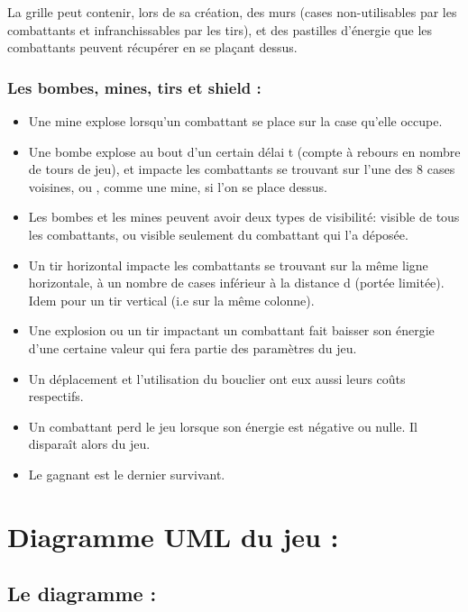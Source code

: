 \documentclass{article}
\begin{document}
La grille peut contenir, lors de sa création, des murs (cases non-utilisables par les combattants et infranchissables par les tirs), et des pastilles d'énergie que les combattants peuvent récupérer en se plaçant dessus.

\vspace{1\baselineskip}

\subsubsection{Les bombes, mines, tirs et shield :}

\vspace{1\baselineskip}

\begin{itemize}
    \item Une mine explose lorsqu'un combattant se place sur la case qu'elle occupe.
    \item Une bombe explose au bout d'un certain délai t (compte à rebours en nombre de tours de jeu),
	et impacte les combattants se trouvant sur l'une des 8 cases voisines, ou , comme une mine,	si l'on se place dessus.
	\item Les bombes et les mines peuvent avoir deux types de visibilité: visible de tous les combattants, ou visible seulement du combattant qui l'a déposée.
	\item Un tir horizontal impacte les combattants se trouvant sur la même ligne horizontale, à un nombre de cases inférieur à la distance d (portée limitée). Idem pour un tir vertical (i.e sur la même
	colonne).
	\item Une explosion ou un tir impactant un combattant fait baisser son énergie d'une certaine valeur qui fera partie des paramètres du jeu.
	\item Un déplacement et l'utilisation du bouclier ont eux aussi leurs coûts respectifs.
    \item Un combattant perd le jeu lorsque son énergie est négative ou nulle. Il disparaît alors du jeu.
    \item Le gagnant est le dernier survivant.
\end{itemize}

\vspace{1\baselineskip}

\section{Diagramme UML du jeu :}

\subsection{Le diagramme :}
\end{document}
